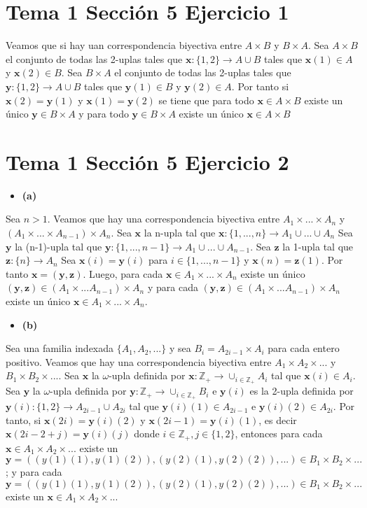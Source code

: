 \documentclass{article}
\newcommand{\vect}[1]{\boldsymbol{#1}}
\begin{document}
\section{Tema 1 Sección 5 Ejercicio 1}
Veamos que si hay uan correspondencia biyectiva entre $A\times B$ y $B\times A$. Sea $A\times B$ el conjunto de todas las 2-uplas tales que $\vect{x}:\{1,2\}\rightarrow A\cup B$ tales que $\vect{x}(1)\in A$ y $\vect{x}(2)\in B$. Sea $B\times A$ el conjunto de todas las 2-uplas tales que $\vect{y}:\{1,2\}\rightarrow A\cup B$ tales que $\vect{y}(1)\in B$ y $\vect{y}(2)\in A$. Por tanto si $\vect{x}(2)=\vect{y}(1)$ y $\vect{x}(1)=\vect{y}(2)$ se tiene que para todo $\vect{x}\in A\times B$ existe un único $\vect{y}\in B\times A$ y  
para todo $\vect{y}\in B\times A$ existe un único $\vect{x}\in A\times B$
\section{Tema 1 Sección 5 Ejercicio 2}
\begin{itemize}
\item \bf (a) \rm
\end{itemize}
Sea $n>1$. Veamos que hay una correspondencia biyectiva entre $A_1\times ...\times A_n$ y $(A_1\times ...\times A_{n-1})\times A_n$. Sea $\vect{x}$ la n-upla tal que $\vect{x}:\{1,...,n\}\rightarrow A_1\cup...\cup A_n$ Sea $\vect{y}$ la (n-1)-upla tal que $\vect{y}:\{1,...,n-1\}\rightarrow A_1\cup...\cup A_{n-1}$. Sea $\vect{z}$ la 1-upla tal que $\vect{z}:\{n\}\rightarrow A_{n}$ Sea $\vect{x}(i)=\vect{y}(i)$ para $i\in\{1,...,n-1\}$ y $\vect{x}(n)=\vect{z}(1)$. Por tanto $\vect{x}=(\vect{y},\vect{z})$. Luego, para cada $\vect{x}\in A_1\times ...\times A_n$ existe un único $(\vect{y},\vect{z})\in (A_1\times ...A_{n-1})\times A_n$ y para cada $(\vect{y},\vect{z})\in (A_1\times ...A_{n-1})\times A_n$ existe un único $\vect{x}\in A_1\times ...\times A_n$.
\begin{itemize}
\item \bf (b) \rm
\end{itemize}
Sea una familia indexada $\{A_1,A_2,...\}$ y sea $B_i=A_{2i-1}\times A_{i}$ para cada entero positivo. Veamos que hay una correspondencia biyectiva entre $A_1\times A_2 \times ...$ y $B_1\times B_2 \times ...$. Sea  $\vect{x}$ la $\omega$-upla definida por $\vect{x}:\mathbb{Z}_{+} \rightarrow \cup_{i\in\mathbb{Z}_{+}}A_i$ tal que $\vect{x}(i)\in A_i$. Sea  $\vect{y}$ la $\omega$-upla definida por $\vect{y}:\mathbb{Z}_{+} \rightarrow \cup_{i\in\mathbb{Z}_{+}}B_i$  e $\vect{y}(i)$ es la 2-upla definida por $\vect{y}(i):\{1,2\}\rightarrow A_{2i-1}\cup A_{2i}$ tal que $\vect{y}(i)(1)\in A_{2i-1}$ e $\vect{y}(i)(2)\in A_{2i}$. Por tanto, si $\vect{x}(2i) = \vect{y}(i)(2)$ y $\vect{x}(2i-1) = \vect{y}(i)(1)$, es decir $\vect{x}(2i-2+j) = \vect{y}(i)(j)$ donde $i\in\mathbb{Z}_{+},j\in\{1,2\}$, entonces para cada $\vect{x}\in A_1 \times A_2 \times ...$ existe un $\vect{y}=((y(1)(1),y(1)(2)),(y(2)(1),y(2)(2)),...)\in B_1 \times B_2 \times ...$; y para cada $\vect{y}=((y(1)(1),y(1)(2)),(y(2)(1),y(2)(2)),...)\in B_1 \times B_2 \times ...$ existe un $\vect{x}\in A_1 \times A_2 \times ...$
\end{document}
